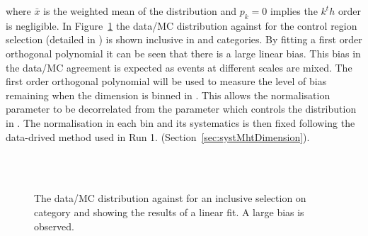 where $\bar{x}$ is the weighted mean of the distribution and $p_k = 0$ 
implies the $k^th$ order is negligible.
In Figure~\ref{fig:linearMotiv} the data/MC 
distribution against \mht for the control region selection 
(detailed in \cite{CMS_AN_2013-366}) is shown inclusive 
in \scalht and categories. By fitting a first order
orthogonal polynomial it can be seen that there is a large linear bias. 
This bias in the data/MC agreement is expected as events 
at different scales are mixed.
The first order orthogonal polynomial
will be used to measure the level of bias remaining 
when the \mht dimension is binned in \scalht.
This allows the normalisation parameter to be
decorrelated from the parameter which controls
the distribution in \mht.
The normalisation in each \scalht bin and its systematics 
is then fixed following the data-drived method used in Run 1. 
(Section~\ref{sec:systMhtDimension}).
\begin{figure}[h!]
  \centering
  ~~
  \\
  ~~
  \\
  \caption{\label{fig:linearMotiv} 
  The data/MC distribution against \mht for an inclusive selection on category and \scalht
  showing the results of a linear fit. A large bias is observed. 
 }
\end{figure}

